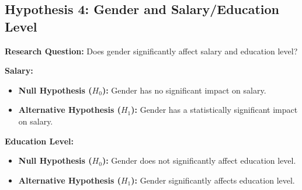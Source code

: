\subsection{Hypothesis 4: Gender and Salary/Education Level}
\textbf{Research Question:} Does gender significantly affect salary and education level?

\textbf{Salary:}
\begin{itemize}
    \item \textbf{Null Hypothesis ($H_0$):} Gender has no significant impact on salary.
    \item \textbf{Alternative Hypothesis ($H_1$):} Gender has a statistically significant impact on salary.
\end{itemize}

\textbf{Education Level:}
\begin{itemize}
    \item \textbf{Null Hypothesis ($H_0$):} Gender does not significantly affect education level.
    \item \textbf{Alternative Hypothesis ($H_1$):} Gender significantly affects education level.
\end{itemize}
